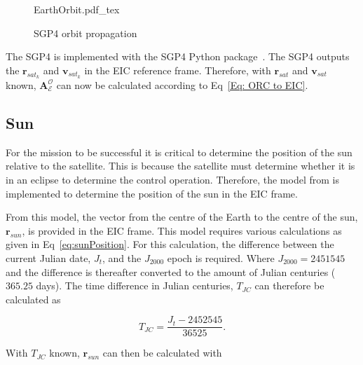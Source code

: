 \begin{figure}[!htb]
	\centering
	\def\svgwidth{10cm}
	{EarthOrbit.pdf_tex}
	\caption{SGP4 orbit propagation}
	\label{fig:EarthOrbit}
\end{figure}


The SGP4 is implemented with the SGP4 Python package~\cite{sgp4}. The SGP4 outputs the $\mathbf{r}_{sat_k}$ and $\mathbf{v}_{sat_k}$ in the EIC reference frame. Therefore, with $\mathbf{r}_{sat}$ and $\mathbf{v}_{sat}$ known, $\boldsymbol{A}^{\mathcal{O}}_{\mathcal{E}}$ can now be calculated according to Eq~\ref{Eq: ORC to EIC}.

\subsection{Sun}
For the mission to be successful it is critical to determine the position of the sun relative to the satellite. This is because the satellite must determine whether it is in an eclipse to determine the control operation. Therefore, the model from \cite{vallado2001fundamentals} is implemented to determine the position of the sun in the EIC frame.

From this model, the vector from the centre of the Earth to the centre of the sun, $\mathbf{r}_{sun}$, is provided in the EIC frame. This model requires various calculations as given in Eq~\ref{eq:sunPosition}. For this calculation, the difference between the current Julian date, $J_t$, and the $J_{2000}$ epoch is required. Where $J_{2000} = \num{2451545}$ and the difference is thereafter converted to the amount of Julian centuries ($\num{365.25}$ days). The time difference in Julian centuries, $T_{JC}$ can therefore be calculated as 

\begin{equation}
T_{JC} = \frac{J_t - \num{2452545}}{\num{36525}}.
\end{equation}

With $T_{JC}$ known, $\mathbf{r}_{sun}$ can then be calculated with

